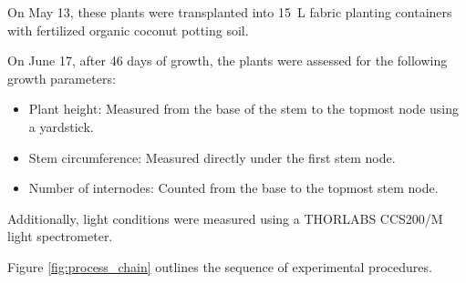 On May 13, these plants were transplanted into \qty[mode=text]{15}{\L} fabric planting containers with fertilized organic coconut potting soil.

On June 17, after \num[mode=text]{46} days of growth, the plants were assessed for the following growth parameters:
\begin{itemize}
    \item Plant height: Measured from the base of the stem to the topmost node using a yardstick.
    \item Stem circumference: Measured directly under the first stem node.
    \item Number of internodes: Counted from the base to the topmost stem node.
\end{itemize}

Additionally, light conditions were measured using a THORLABS CCS200/M light spectrometer.

Figure \ref{fig:process_chain} outlines the sequence of experimental procedures.

